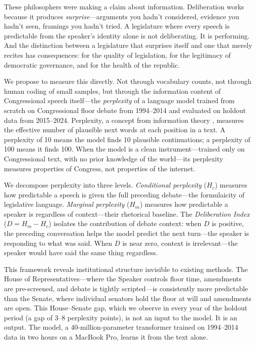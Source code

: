 \documentclass[12pt]{article}
\newcommand{\Hc}{H_c}
\newcommand{\Hm}{H_m}
\newcommand{\DI}{\mathit{D}}
\begin{document}
These philosophers were making a claim about information. Deliberation works because it produces \textit{surprise}---arguments you hadn't considered, evidence you hadn't seen, framings you hadn't tried. A legislature where every speech is predictable from the speaker's identity alone is not deliberating. It is performing. And the distinction between a legislature that surprises itself and one that merely recites has consequences: for the quality of legislation, for the legitimacy of democratic governance, and for the health of the republic.

We propose to measure this directly. Not through vocabulary counts, not through human coding of small samples, but through the information content of Congressional speech itself---the \textit{perplexity} of a language model trained from scratch on Congressional floor debate from 1994--2014 and evaluated on holdout data from 2015--2024. Perplexity, a concept from information theory \citep{shannon1948}, measures the effective number of plausible next words at each position in a text. A perplexity of 10 means the model finds 10 plausible continuations; a perplexity of 100 means it finds 100. When the model is a clean instrument---trained only on Congressional text, with no prior knowledge of the world---its perplexity measures properties of Congress, not properties of the internet.

We decompose perplexity into three levels. \textit{Conditional perplexity} ($\Hc$) measures how predictable a speech is given the full preceding debate---the formulaicity of legislative language. \textit{Marginal perplexity} ($\Hm$) measures how predictable a speaker is regardless of context---their rhetorical baseline. The \textit{Deliberation Index} ($\DI = \Hm - \Hc$) isolates the contribution of debate context: when $\DI$ is positive, the preceding conversation helps the model predict the next turn---the speaker is responding to what was said. When $\DI$ is near zero, context is irrelevant---the speaker would have said the same thing regardless.

This framework reveals institutional structure invisible to existing methods. The House of Representatives---where the Speaker controls floor time, amendments are pre-screened, and debate is tightly scripted---is consistently more predictable than the Senate, where individual senators hold the floor at will and amendments are open. This House--Senate gap, which we observe in every year of the holdout period (a gap of 3--8 perplexity points), is not an input to the model. It is an output. The model, a 40-million-parameter transformer trained on 1994--2014 data in two hours on a MacBook Pro, learns it from the text alone.
\end{document}
